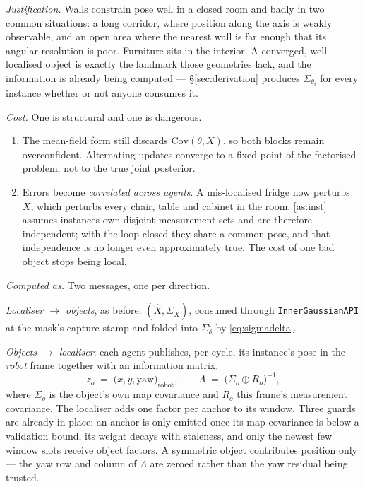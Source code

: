 \documentclass[11pt,a4paper]{report}
\theoremstyle{definition}   %
\begin{document}
\noindent\textit{Justification.} Walls constrain pose well in a closed room and badly in two
common situations: a long corridor, where position along the axis is weakly observable, and an open
area where the nearest wall is far enough that its angular resolution is poor. Furniture sits in the
interior. A converged, well-localised object is exactly the landmark those geometries lack, and the
information is already being computed --- \S\ref{sec:derivation} produces $\Sigma_{\theta_i}$ for
every instance whether or not anyone consumes it.

\smallskip\noindent\textit{Cost.} One is structural and one is dangerous.
\begin{enumerate}[label=(\roman*),leftmargin=1.9em,topsep=3pt,itemsep=3pt]
\item The mean-field form still discards $\mathrm{Cov}(\theta,X)$, so both blocks remain
      overconfident. Alternating updates converge to a fixed point of the factorised problem, not
      to the true joint posterior.
\item Errors become \emph{correlated across agents}. A mis-localised fridge now perturbs $X$, which
      perturbs every chair, table and cabinet in the room. \ref{as:inst} assumes instances own
      disjoint measurement sets and are therefore independent; with the loop closed they share a
      common pose, and that independence is no longer even approximately true. The cost of one bad
      object stops being local.
\end{enumerate}

\smallskip\noindent\textit{Computed as.} Two messages, one per direction.

\emph{Localiser $\to$ objects}, as before: $(\hat X,\Sigma_X)$, consumed through
\texttt{InnerGaussianAPI} at the mask's capture stamp and folded into $\Sigma_\delta^t$ by
\eqref{eq:sigmadelta}.

\emph{Objects $\to$ localiser}: each agent publishes, per cycle, its instance's pose in the
\emph{robot} frame together with an information matrix,
\begin{equation}
z_o\;=\;\big(x,y,\mathrm{yaw}\big)_{\text{robot}},
\qquad
\Lambda\;=\;\big(\Sigma_o\oplus R_o\big)^{-1},
\label{eq:anchormsg}
\end{equation}
where $\Sigma_o$ is the object's own map covariance and $R_o$ this frame's measurement covariance.
The localiser adds one factor per anchor to its window. Three guards are already in place: an
anchor is only emitted once its map covariance is below a validation bound, its weight decays with
staleness, and only the newest few window slots receive object factors. A symmetric object
contributes position only --- the yaw row and column of $\Lambda$ are zeroed rather than the yaw
residual being trusted.
\end{document}
